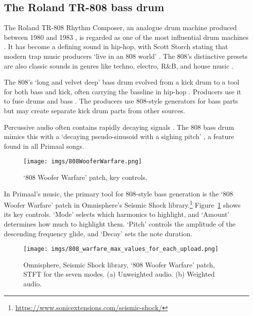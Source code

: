 \documentclass{article}
\begin{document}
\subsection{The Roland TR-808 bass drum}\label{ref:bassgeneration}


The Roland TR-808 Rhythm Composer, an analogue drum machine produced between 1980 and 1983 \citep{hasnain2017tr}, is regarded as one of the most influential drum machines \citep{meyers2003tr,werner2014physically}. It has become a defining sound in hip-hop, with Scott Storch stating that modern trap music producers `live in an 808 world' \citep{storch2022}. The 808's distinctive presets are also classic sounds in genres like techno, electro, R\&B, and house music \citep{dayal2014tr}.


The 808's `long and velvet deep' bass drum \citep{carter1997tr} evolved from a kick drum to a tool for both bass and kick, often carrying the bassline in hip-hop \citep{lavoie2020}. Producers use it to fuse drums and bass \citep{Dunn2015,burke2019}. The producers use 808-style generators for bass parts but may create separate kick drum parts from other sources.

Percussive audio often contains rapidly decaying signals \citep{shier2023differentiable}. The 808 bass drum mimics this with a `decaying pseudo-sinusoid with a sighing pitch' \citep{werner2014physically}, a feature found in all Primaal songs.



 

\begin{figure}[htbp]
  \centering
  \texttt{[image: imgs/808WooferWarfare.png]}
  \caption{`808 Woofer Warfare' patch, key controls.}
\label{fig:808WooferWarfare}
\end{figure}

In Primaal's music, the primary tool for 808-style bass generation is the `808 Woofer Warfare' patch in Omnisphere's Seismic Shock library.\footnote{\url{https://www.sonicextensions.com/seismic-shock/}} Figure~\ref{fig:808WooferWarfare} shows its key controls. `Mode' selects which harmonics to highlight, and `Amount' determines how much to highlight them. `Pitch' controls the amplitude of the descending frequency glide, and `Decay' sets the note duration.

\begin{figure}[htbp]
  \centering
  \texttt{[image: imgs/808\_warfare\_max\_values\_for\_each\_upload.png]}
  \caption{Omnisphere, Seismic Shock library, `808 Woofer Warfare' patch, STFT for the seven modes. (a) Unweighted audio. (b) Weighted audio.}
\label{fig:808warfare}
\end{figure}
\end{document}
